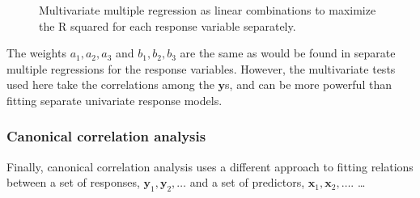 \documentclass[
  letterpaper,
  10pt,
  krantz2]{krantz}
\begin{document}
\begin{figure}


\caption{\label{fig-lin-comb3}Multivariate multiple regression as linear
combinations to maximize the R squared for each response variable
separately.}

\end{figure}%

The weights \(a_1, a_2, a_3\) and \(b_1, b_2, b_3\) are the same as
would be found in separate multiple regressions for the response
variables. However, the multivariate tests used here take the
correlations among the \(\mathbf{y}\)s, and can be more powerful than
fitting separate univariate response models.

\subsubsection*{Canonical correlation
analysis}\label{canonical-correlation-analysis}

Finally, canonical correlation analysis uses a different approach to
fitting relations between a set of responses,
\(\mathbf{y}_1, \mathbf{y}_2, \dots\) and a set of predictors,
\(\mathbf{x}_1, \mathbf{x}_2, \dots\). \ldots{}
\end{document}
